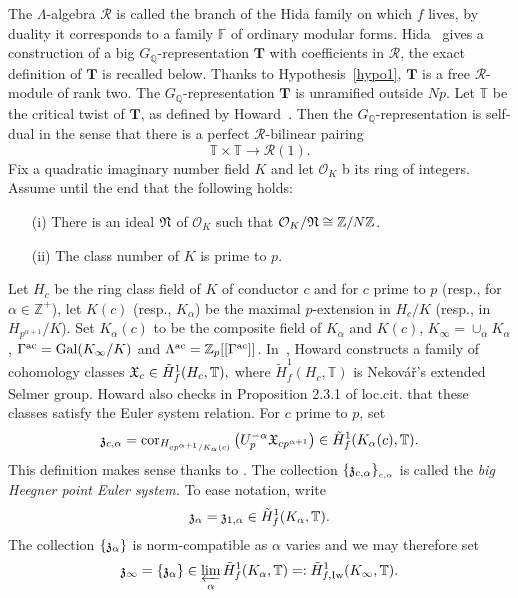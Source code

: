 \documentclass[12pt]{amsart}
\numberwithin{equation}{section}
\newenvironment{hypo}{\par\medskip\noindent\refstepcounter{thm}
\bgroup{\hspace*{-0.15 cm}\bf{Hypothesis}
\thethm.}\bgroup}{\egroup \egroup\par\medskip}
\begin{document}
The ${\Lambda}$-algebra $\mathcal{R}$ is called the branch of the Hida
family on which $f$ lives, by duality it corresponds to a family $\mathbb{F}$ of ordinary modular forms. Hida~\cite{hidaens86} gives a
construction of a  big $G_{\mathbb{Q}}$-representation $\mathbf{T}$ with
coefficients in $\mathcal{R}$, the exact definition of $\mathbf{T}$ is
recalled below. Thanks to Hypothesis~\ref{hypo1}, $\mathbf{T}$
is a free ${\mathcal{R}}$-module of rank two. The
$G_{\mathbb{Q}}$-representation $\mathbf{T}$ is unramified outside $Np$.
Let ${\mathbb{T}}$ be the critical twist of $\mathbf{T}$, as defined by
Howard~\cite[Definition 2.1.3]{howard}. Then the
$G_{\mathbb{Q}}$-representation is self-dual in the sense that there is a
perfect $\mathcal{R}$-bilinear pairing
$${\mathbb{T}}\times{\mathbb{T}} {\longrightarrow} \mathcal{R}(1).$$
Fix a quadratic imaginary number field $K$ and let ${\mathcal{O}}_K$ b its
ring of integers.  Assume until the end that the following holds:
\begin{hypo}
\label{hypo2}
\begin{itemize}
\item[(i)]There is an ideal $\frak{N}$ of ${\mathcal{O}}_K$ such that ${\mathcal{O}}_K/\frak{N}
\cong {\mathbb{Z}}/N{\mathbb{Z}}$.
\item[(ii)] The class number of $K$ is prime to $p$.
\end{itemize}
\end{hypo}
Let $H_{c}$ be the ring class field of $K$ of conductor ${c}$ and for $c$ prime to $p$ (resp., for $\alpha \in {\mathbb{Z}}^+$), let $K(c)$ (resp., $K_\alpha$) be the maximal $p$-extension in $H_c/K$ (resp., in $H_{p^{\alpha+1}}/K$). Set $K_\alpha(c)$ to be the composite field of $K_\alpha$ and $K(c)$, $K_\infty=\cup_\alpha K_\alpha$, $\Gamma^{\textup{ac}}=\textup{Gal}(K_\infty/K)$ and ${\Lambda}^{\textup{ac}}={\mathbb{Z}}_p[[\Gamma^{\textup{ac}}]]$.
In~\cite[\S2.2]{howard}, Howard constructs a family of cohomology
classes $\frak{X}_{c} \in \tilde{H}_f^1(H_{c}, {\mathbb{T}}),$
where $\tilde{H}_f^1(H_{c}, {\mathbb{T}})$ is Nekov\'a\v{r}'s \cite[\S6]{nek}
extended Selmer group. Howard also checks in Proposition 2.3.1 of loc.cit. that these
classes satisfy the Euler system relation. For $c$ prime to $p$, set 
$$\frak{z}_{c,\alpha}=\textup{cor}_{H_{cp^{\alpha+1}/K_\alpha(c)}} \left(U_p^{-\alpha} \frak{X}_{cp^{\alpha+1}}\right) \in \tilde{H}_f^1(K_\alpha(c),{\mathbb{T}}).$$
This definition makes sense thanks to \cite[Proposition 2.3.1]{howard}. The collection $\{\frak{z}_{c,\alpha}\}_{_{c,\alpha}}$ is called the
\emph{big Heegner point Euler system.} To ease notation, write
$$\frak{z}_\alpha=\frak{z}_{1,\alpha}\in \tilde{H}_f^1(K_\alpha,{\mathbb{T}}).$$ 
The collection $\{\frak{z_\alpha}\}$ is norm-compatible as $\alpha$ varies and we may therefore set $$\frak{z_\infty}=\{\frak{z}_\alpha\} \in \varprojlim_\alpha \tilde{H}_f^1(K_\alpha,{\mathbb{T}})=: \tilde{H}_{f,\textup{Iw}}^1(K_\infty,{\mathbb{T}}).$$
\end{document}
